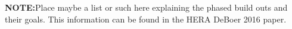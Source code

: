 \documentclass[a0,landscape]{a0poster}
\begin{document}
\begin{multicols}{4}
\textbf{NOTE:}Place maybe a list or such here explaining the phased build outs and their goals. This information can be found in the HERA DeBoer 2016 paper.






\color{DarkSlateGray} %








\end{multicols}
\end{document}
